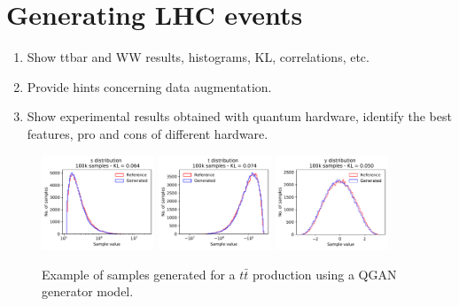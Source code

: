 \documentclass[twocolumn,preprintnumbers,superscriptaddress]{revtex4-2}
\begin{document}
\section{Generating LHC events}
\label{sec:lhc}

\begin{enumerate}
  \item Show ttbar and WW results, histograms, KL, correlations, etc.
  \item Provide hints concerning data augmentation.
  \item Show experimental results obtained with quantum hardware, identify the
  best features, pro and cons of different hardware.
\end{enumerate}

\begin{figure}
  \includegraphics[width=0.3\textwidth]{plots/LHCttbar/s-distribution_LHCdata_100k.pdf}%
  \includegraphics[width=0.3\textwidth]{plots/LHCttbar/t-distribution_LHCdata_100k.pdf}%
  \includegraphics[width=0.3\textwidth]{plots/LHCttbar/y-distribution_LHCdata_100k.pdf}

  \caption{\label{fig:3dgauss}Example of samples generated for a $t\bar{t}$
  production using a QGAN generator model.}
\end{figure}
\end{document}
